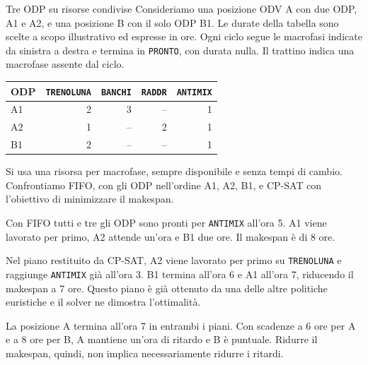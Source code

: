 \begingroup
{}
\begin{examplebox}{Tre ODP su risorse condivise}
Consideriamo una posizione ODV A con due ODP, A1 e A2, e una posizione B con il solo ODP B1. Le durate della tabella sono scelte a scopo illustrativo ed espresse in ore. Ogni ciclo segue le macrofasi indicate da sinistra a destra e termina in \texttt{PRONTO}, con durata nulla. Il trattino indica una macrofase assente dal ciclo.

\begin{center}
\small
\begin{tabular}{@{}lrrrr@{}}
\toprule
\textbf{ODP} & \texttt{TRENOLUNA} & \texttt{BANCHI} & \texttt{RADDR} & \texttt{ANTIMIX}\\
\midrule
A1 & 2 & 3 & -- & 1\\
A2 & 1 & -- & 2 & 1\\
B1 & 2 & -- & -- & 1\\
\bottomrule
\end{tabular}
\end{center}

Si usa una risorsa per macrofase, sempre disponibile e senza tempi di cambio. Confrontiamo FIFO, con gli ODP nell'ordine A1, A2, B1, e CP-SAT con l'obiettivo di minimizzare il makespan.

\begin{center}
\reportfigurecontent{}
\end{center}

Con FIFO tutti e tre gli ODP sono pronti per \texttt{ANTIMIX} all'ora 5. A1 viene lavorato per primo, A2 attende un'ora e B1 due ore. Il makespan è di 8 ore.

Nel piano restituito da CP-SAT, A2 viene lavorato per primo su \texttt{TRENOLUNA} e raggiunge \texttt{ANTIMIX} già all'ora 3. B1 termina all'ora 6 e A1 all'ora 7, riducendo il makespan a 7 ore. Questo piano è già ottenuto da una delle altre politiche euristiche e il solver ne dimostra l'ottimalità.

La posizione A termina all'ora 7 in entrambi i piani. Con scadenze a 6 ore per A e a 8 ore per B, A mantiene un'ora di ritardo e B è puntuale. Ridurre il makespan, quindi, non implica necessariamente ridurre i ritardi.
\end{examplebox}
\endgroup
